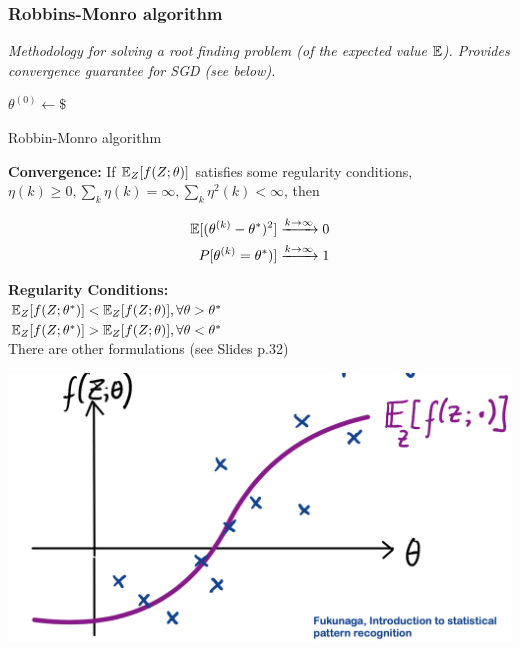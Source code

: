 \subsubsection{Robbins-Monro algorithm}
\textit{Methodology for solving a root finding problem (of the expected value $\mathbb E$). Provides convergence guarantee for SGD (see below).}

\begin{algorithm}[H]  

	$\theta^{(0)} \gets \$$ \\
  \caption{Robbin-Monro algorithm}
\end{algorithm}

\textbf{Convergence: } If $\mathbb E_Z[f(Z;\theta)]$ satisfies some regularity conditions, $\eta(k) \geq 0, \sum_k \eta(k) = \infty, \sum_k \eta^2(k) < \infty$, then 

\begin{align*}
	\mathbb E[(\theta^{(k)} - \theta^*)^2] &\xrightarrow{k\to\infty} 0 \\
	P[\theta^{(k)} = \theta^*)] &\xrightarrow{k\to\infty} 1
\end{align*}


\begin{minipage}{0.6\columnwidth}
\textbf{Regularity Conditions: }\\
	$\mathbb E_Z[f(Z;\theta^*)] < \mathbb E_Z[f(Z;\theta)], \forall \theta > \theta^*$ \\
	$\mathbb E_Z[f(Z;\theta^*)] > \mathbb E_Z[f(Z;\theta)], \forall \theta < \theta^*$ \\
	There are other formulations (see Slides p.32)
\end{minipage}
\begin{minipage}{0.3\columnwidth}
	\includegraphics[width=\columnwidth]{images/10-robbin-monro}
\end{minipage}






